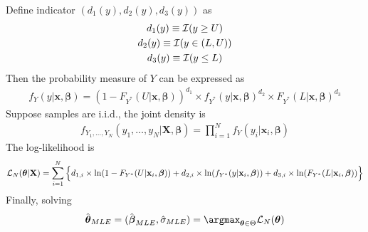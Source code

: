 \documentclass[11pt]{article}
\newcommand{\bm}[1]{\boldsymbol{#1}}
\begin{document}
		Define indicator $(d_1(y), d_2(y), d_3(y))$ as 
		\begin{gather}
			d_1(y) \equiv \mathcal{{I}}(y \geq U) \\
			d_2(y) \equiv \mathcal{{I}}(y \in (L, U)) \\
			d_3(y) \equiv \mathcal{{I}}(y \leq L)
		\end{gather}
		Then the probability measure of $Y$ can be expressed as
		\begin{gather}
			f_Y(y|\textbf{x}, \bm{\beta}) 
			= (1 - F_{Y^*}(U|\textbf{x}, \bm{\beta}))^{d_1} 
			\times f_{Y^*}(y|\textbf{x}, \bm{\beta}) ^ {d_2} 
			\times F_{Y^*}(L|\textbf{x}, \bm{\beta})^{d_3}
		\end{gather}
		Suppose samples are i.i.d., the joint density is
		\begin{gather}
			f_{Y_1, \dots, Y_N}(y_1, \dots, y_N|\textbf{X}, \bm{\beta}) = \prod_{i=1}^N f_Y (y_i|\textbf{x}_i, \bm{\beta})
		\end{gather}
		The log-likelihood is
		\begin{gather}
			\mc{L}_N (\bm{\theta}|\textbf{X}) = \sum_{i=1}^N \Big\{
			d_{1,i} \times \ln(1 - F_{Y^*}(U|\textbf{x}_i, \bm{\beta})) + d_{2,i} \times \ln(f_{Y^*}(y|\textbf{x}_i, \bm{\beta})) + d_{3,i} \times \ln(F_{Y^*}(L|\textbf{x}_i, \bm{\beta}))
			\Big\}
		\end{gather}
		Finally, solving
		\begin{equation}
			\hat{\bm{\theta}}_{MLE}
			= (\hat{\bm{\beta}}_{MLE}, \hat{\sigma}_{MLE}) = \argmax_{\bm{\theta} \in \Theta} \mc{L}_N (\bm{\theta})
		\end{equation}
		
\end{document}
